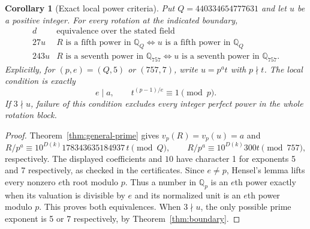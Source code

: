 \documentclass[10pt]{article}
\newtheorem{corollary}{Corollary}
\newcommand{\Q}{\mathbb Q}
\begin{document}
\begin{corollary}[Exact local power criteria]\label{cor:higher}
Put $Q=440334654777631$ and let $u$ be a positive integer.
For every rotation at the indicated boundary,
\[
 \begin{array}{c|c}
 d&\text{equivalence over the stated field}\\\hline
 27u&R\text{ is a fifth power in }\Q_Q
          \iff u\text{ is a fifth power in }\Q_Q\\
 243u&R\text{ is a seventh power in }\Q_{757}
          \iff u\text{ is a seventh power in }\Q_{757}.
 \end{array}
\]
Explicitly, for $(p,e)=(Q,5)$ or $(757,7)$, write $u=p^at$ with $p\nmid t$.
The local condition is exactly
\begin{equation}\label{eq:full-local-criterion}
 e\mid a,\qquad t^{(p-1)/e}\equiv1\pmod p.
\end{equation}
If $3\nmid u$, failure of this condition excludes every integer perfect power
in the whole rotation block.
\end{corollary}
\begin{proof}
Theorem~\ref{thm:general-prime} gives $v_p(R)=v_p(u)=a$ and
\[
 R/p^a\equiv10^{D(k)}178343635184937\,t\pmod Q,\qquad
 R/p^a\equiv10^{D(k)}300t\pmod{757},
\]
respectively. The displayed coefficients and $10$ have character 1 for
exponents 5 and 7 respectively, as checked in the certificates.
Since $e\ne p$, Hensel's lemma lifts every nonzero $e$th root modulo $p$.
Thus a number in $\Q_p$ is an $e$th power exactly when its valuation is
divisible by $e$ and its normalized unit is an $e$th power modulo $p$.
This proves both equivalences. When $3\nmid u$, the only possible prime
exponent is 5 or 7 respectively, by Theorem~\ref{thm:boundary}.
\end{proof}
\end{document}
